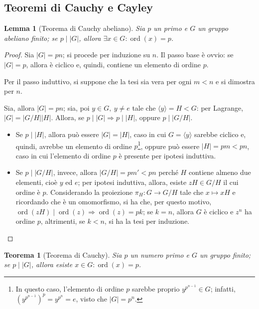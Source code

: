 \documentclass[12pt]{scrartcl}
\theoremstyle{style}
\newtheorem{teorema}{Teorema}[section]
\newtheorem{lemma}{Lemma}[teorema]
\numberwithin{equation}{subsection}
\begin{document}
\subsection{Teoremi di Cauchy e Cayley}
\begin{lemma}[Teorema di Cauchy abeliano]\label{cab}
	Sia $p$ un primo e $G$ un gruppo abeliano finito; se $p  \mid  |G|$, allora $\exists x \in G : \operatorname{ord}(x) =p$.
\end{lemma}
	\begin{proof}
		Sia $\lvert G \rvert = pn$; si procede per induzione su $n$.
		Il passo base \`e ovvio: se $\lvert G \rvert =p$, allora \`e ciclico e, quindi, contiene un elemento di ordine $p$.

		Per il passo induttivo, si suppone che la tesi sia vera per ogni $m < n$ e si dimostra per $n$.

		Sia, allora $\lvert G \rvert  = pn$; sia, poi $y \in G, \ y\neq e$ tale che $\langle y \rangle= H < G$: per Lagrange, $\lvert G \rvert  = \lvert G / H \rvert  \lvert H \rvert $.
		Allora, se $p  \mid \lvert G \rvert \Rightarrow  p  \mid \lvert H \rvert $, oppure $ p   \mid \lvert G / H \rvert $.
		\begin{itemize}
			\item Se $p  \mid \lvert H \rvert $, allora pu\`o essere $\lvert G \rvert  = \lvert H \rvert $, caso in cui $G = \langle y \rangle$ sarebbe ciclico e, quindi, avrebbe un elemento di ordine $p$\footnote{In questo caso, l'elemento di ordine $p$ sarebbe proprio $y^{p^{n-1} } \in G $; infatti, $(y^{p^{n-1} } )^p = y^{p^n} = e$, visto che $|G| = p^n$.}, oppure pu\`o essere $\lvert H \rvert  = pm < pn$, caso in cui l'elemento di ordine $p$ \`e presente per ipotesi induttiva.
			\item Se $p  \mid  \lvert G / H \rvert $, invece, allora $\lvert G / H \rvert = pm' < pn$ perch\'e $H$ contiene almeno due elementi, cio\`e $y$ ed $e$; per ipotesi induttiva, allora, esiste $zH \in G / H$ il cui ordine \`e $p$.
				Considerando la proiezione $\pi_H : G \to G / H$ tale che $x \mapsto xH$ e ricordando che \`e un omomorfismo, si ha che, per questo motivo, $\operatorname{ord}(zH)  \mid \operatorname{ord}(z)\Rightarrow \operatorname{ord}(z) = pk$; se $k = n$, allora $G$ \`e ciclico e $z^n$ ha ordine $p$, altrimenti, se $k<n$, si ha la tesi per induzione.
		\end{itemize}
	\end{proof}
\begin{teorema}
	[Teorema di Cauchy]
	Sia $p$ un numero primo e $G$ un gruppo finito; se $p  \mid |G|$, allora esiste $x \in G : \operatorname{ord}(x) = p $.
\end{teorema}
\end{document}

